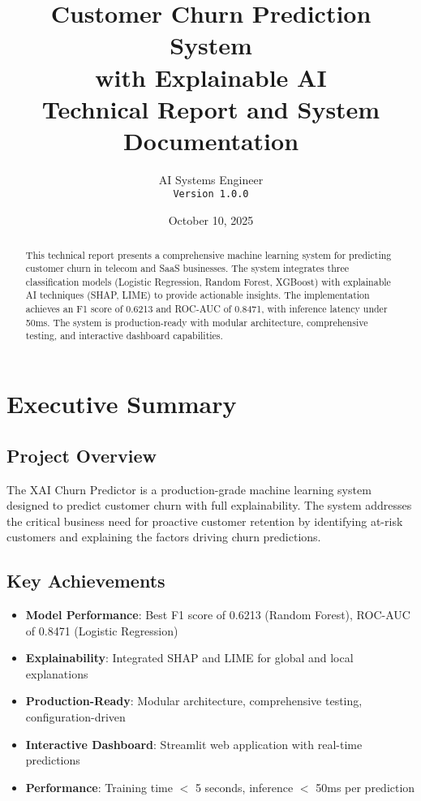 \documentclass[11pt,a4paper]{article}
\title{\textbf{Customer Churn Prediction System\\with Explainable AI}\\
\large Technical Report and System Documentation}
\author{AI Systems Engineer\\
\texttt{Version 1.0.0}}
\date{October 10, 2025}
\begin{document}
\maketitle
\thispagestyle{empty}

\begin{abstract}
This technical report presents a comprehensive machine learning system for predicting customer churn in telecom and SaaS businesses. The system integrates three classification models (Logistic Regression, Random Forest, XGBoost) with explainable AI techniques (SHAP, LIME) to provide actionable insights. The implementation achieves an F1 score of 0.6213 and ROC-AUC of 0.8471, with inference latency under 50ms. The system is production-ready with modular architecture, comprehensive testing, and interactive dashboard capabilities.
\end{abstract}

\newpage
\tableofcontents
\newpage

\section{Executive Summary}

\subsection{Project Overview}
The XAI Churn Predictor is a production-grade machine learning system designed to predict customer churn with full explainability. The system addresses the critical business need for proactive customer retention by identifying at-risk customers and explaining the factors driving churn predictions.

\subsection{Key Achievements}
\begin{itemize}
    \item \textbf{Model Performance}: Best F1 score of 0.6213 (Random Forest), ROC-AUC of 0.8471 (Logistic Regression)
    \item \textbf{Explainability}: Integrated SHAP and LIME for global and local explanations
    \item \textbf{Production-Ready}: Modular architecture, comprehensive testing, configuration-driven
    \item \textbf{Interactive Dashboard}: Streamlit web application with real-time predictions
    \item \textbf{Performance}: Training time $<$ 5 seconds, inference $<$ 50ms per prediction
\end{itemize}
\end{document}
